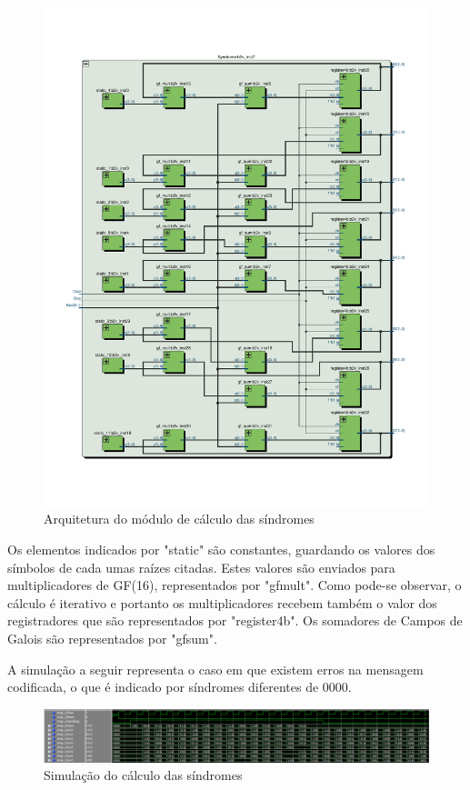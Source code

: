 	\begin{figure}[!htb]
		\caption{\label{fig_sindrome_arq} Arquitetura do módulo de cálculo das síndromes}
		\centering
		\includegraphics[width=1\textwidth]{RS/SindromeRTL.pdf}
		\legend{}
	\end{figure}
	
	
	Os elementos indicados por "static" são constantes, guardando os valores dos símbolos de cada umas raízes citadas. Estes valores são enviados para multiplicadores de GF(16), representados por "gfmult". Como pode-se observar, o cálculo é iterativo e portanto os multiplicadores recebem também o valor dos registradores que são representados por "register4b". Os somadores de Campos de Galois são representados por "gfsum".
	
	A simulação a seguir representa o caso em que existem erros na mensagem codificada, o que é indicado por síndromes diferentes de 0000.
	
	\begin{figure}[!htb]
		\caption{\label{fig_sindrome_sim} Simulação do cálculo das síndromes}
		\centering
		\includegraphics[width=1\textwidth]{RS/Sim_sindrome.PNG}
		\legend{}
	\end{figure}

